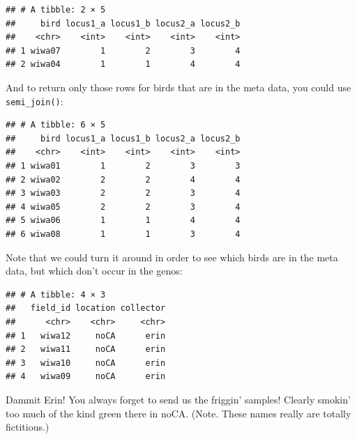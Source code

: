 \documentclass[]{book}
\newenvironment{Shaded}{\begin{snugshade}}{\end{snugshade}}
\newcommand{\KeywordTok}[1]{\textcolor[rgb]{0.13,0.29,0.53}{\textbf{{#1}}}}
\newcommand{\DataTypeTok}[1]{\textcolor[rgb]{0.13,0.29,0.53}{{#1}}}
\newcommand{\StringTok}[1]{\textcolor[rgb]{0.31,0.60,0.02}{{#1}}}
\newcommand{\NormalTok}[1]{{#1}}
\theoremstyle{definition}
\theoremstyle{definition}
\theoremstyle{remark}
\begin{document}
\begin{verbatim}
## # A tibble: 2 × 5
##     bird locus1_a locus1_b locus2_a locus2_b
##    <chr>    <int>    <int>    <int>    <int>
## 1 wiwa07        1        2        3        4
## 2 wiwa04        1        1        4        4
\end{verbatim}

And to return only those rows for birds that are in the meta data, you
could use \texttt{semi\_join()}:

\begin{Shaded}
\end{Shaded}

\begin{verbatim}
## # A tibble: 6 × 5
##     bird locus1_a locus1_b locus2_a locus2_b
##    <chr>    <int>    <int>    <int>    <int>
## 1 wiwa01        1        2        3        3
## 2 wiwa02        2        2        4        4
## 3 wiwa03        2        2        3        4
## 4 wiwa05        2        2        3        4
## 5 wiwa06        1        1        4        4
## 6 wiwa08        1        1        3        4
\end{verbatim}

Note that we could turn it around in order to see which birds are in the
meta data, but which don't occur in the genos:

\begin{Shaded}
\end{Shaded}

\begin{verbatim}
## # A tibble: 4 × 3
##   field_id location collector
##      <chr>    <chr>     <chr>
## 1   wiwa12     noCA      erin
## 2   wiwa11     noCA      erin
## 3   wiwa10     noCA      erin
## 4   wiwa09     noCA      erin
\end{verbatim}

Dammit Erin! You always forget to send us the friggin' samples! Clearly
smokin' too much of the kind green there in noCA. (Note. These names
really are totally fictitious.)
\end{document}
